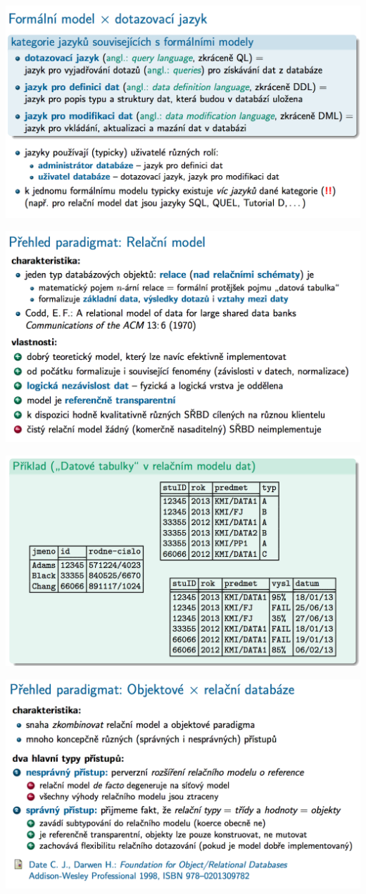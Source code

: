 \documentclass[10pt,a4paper]{article}
\begin{document}
	\includegraphics[scale=0.4]{img/3}
	
	\includegraphics[scale=0.4]{img/4}
	
	\includegraphics[scale=0.4]{img/5}
	
	\includegraphics[scale=0.4]{img/6}	
\end{document}
